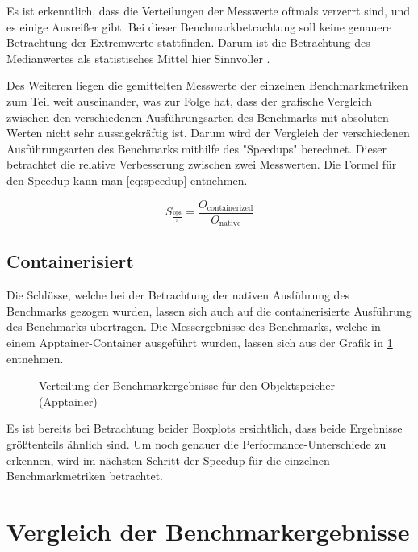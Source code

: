 Es ist erkenntlich, dass die Verteilungen der Messwerte oftmals verzerrt sind, und es einige Ausreißer gibt. Bei dieser Benchmarkbetrachtung soll keine genauere Betrachtung der Extremwerte stattfinden. Darum ist die Betrachtung des Medianwertes als statistisches Mittel hier Sinnvoller \cite[Vgl. 15f.]{stengelStatistikUndAufbereitung2011}. 

Des Weiteren liegen die gemittelten Messwerte der einzelnen Benchmarkmetriken zum Teil weit auseinander, was zur Folge hat, dass der grafische Vergleich zwischen den verschiedenen Ausführungsarten des Benchmarks mit absoluten Werten nicht sehr aussagekräftig ist. Darum wird der Vergleich der verschiedenen Ausführungsarten des Benchmarks mithilfe des "Speedups" berechnet. Dieser betrachtet die relative Verbesserung zwischen zwei Messwerten. Die Formel für den Speedup kann man \cref{eq:speedup} entnehmen.


\begin{equation} \label{eq:speedup}
S_{\frac{\text{ops}}{\text{s}}} = \frac{O_{\text{containerized}}}{O_{\text{native}}}
\end{equation}


\subsection{Containerisiert}

Die Schlüsse, welche bei der Betrachtung der nativen Ausführung des Benchmarks gezogen wurden, lassen sich auch auf die containerisierte Ausführung des Benchmarks übertragen. Die Messergebnisse des Benchmarks, welche in einem Apptainer-Container ausgeführt wurden, lassen sich aus der Grafik in \cref{fig:boxplot_object_apptainer} entnehmen.


\begin{figure}[H]
    
    \caption{Verteilung der Benchmarkergebnisse für den Objektspeicher (Apptainer)}
    \label{fig:boxplot_object_apptainer}
\end{figure}


Es ist bereits bei Betrachtung beider Boxplots ersichtlich, dass beide Ergebnisse größtenteils ähnlich sind. Um noch genauer die Performance-Unterschiede zu erkennen, wird im nächsten Schritt der Speedup für die einzelnen Benchmarkmetriken betrachtet.


\pagebreak

\section{Vergleich der Benchmarkergebnisse}

